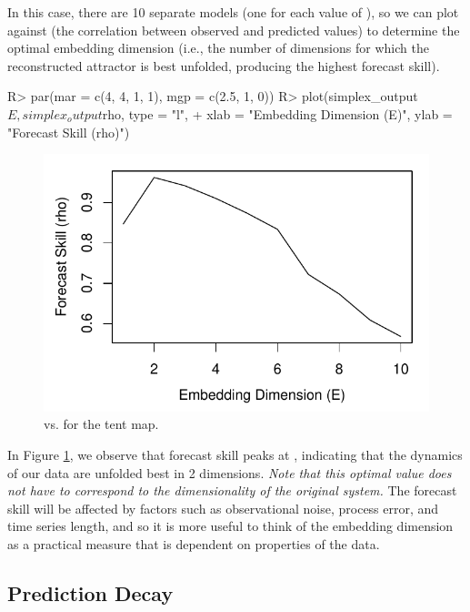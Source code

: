 \documentclass[article]{jss}
\begin{document}
In this case, there are 10 separate models (one for each value of ), so we can plot  against  (the correlation between observed and predicted values) to determine the optimal embedding dimension (i.e., the number of dimensions for which the reconstructed attractor is best unfolded, producing the highest forecast skill).

\begin{Schunk}
\begin{Sinput}
R> par(mar = c(4, 4, 1, 1), mgp = c(2.5, 1, 0))
R> plot(simplex_output$E, simplex_output$rho, type = "l",  
+       xlab = "Embedding Dimension (E)", ylab = "Forecast Skill (rho)")
\end{Sinput}
\end{Schunk}

\begin{figure}[t!]
\centering
\includegraphics[width=4.5in]{article-simplex-e}
\caption{\label{fig:simplex-e}  vs.  for the tent map.}
\end{figure}

In Figure \ref{fig:simplex-e}, we observe that forecast skill peaks at , indicating that the dynamics of our data are unfolded best in 2 dimensions. \emph{Note that this optimal value does not have to correspond to the dimensionality of the original system.}  The forecast skill will be affected by factors such as observational noise, process error, and time series length, and so it is more useful to think of the embedding dimension as a practical measure that is dependent on properties of the data.

\subsection{Prediction Decay}\label{sec:prediction-decay}
\end{document}
